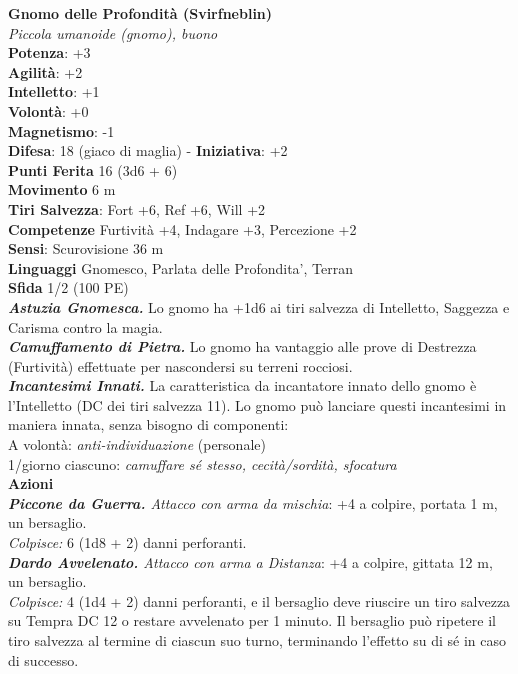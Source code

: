\begin{multicols}{2}
\medskip\textbf{Gnomo delle Profondità (Svirfneblin)} \\
\emph{Piccola umanoide (gnomo), buono}\\
\textbf{Potenza}: +3\\
\textbf{Agilità}: +2\\
\textbf{Intelletto}: +1\\
\textbf{Volontà}: +0\\
\textbf{Magnetismo}: -1\\
\textbf{Difesa}: 18 (giaco di maglia) - \textbf{Iniziativa}: +2\\
\textbf{Punti Ferita} 16 (3d6 + 6)\\
\textbf{Movimento} 6 m\\
\textbf{Tiri Salvezza}: Fort +6, Ref +6, Will +2\\
\textbf{Competenze} Furtività +4, Indagare +3, Percezione +2\\
\textbf{Sensi}: Scurovisione 36 m\\
\textbf{Linguaggi} Gnomesco, Parlata delle Profondita', Terran\\
\textbf{Sfida} 1/2 (100 PE)\smallskip\\
\emph{\textbf{Astuzia Gnomesca.}} Lo gnomo ha +1d6 ai tiri salvezza di Intelletto, Saggezza e Carisma contro la magia.\\
\emph{\textbf{Camuffamento di Pietra.}} Lo gnomo ha vantaggio alle prove di Destrezza (Furtività) effettuate per nascondersi su terreni rocciosi.\\
\emph{\textbf{Incantesimi Innati.}} La caratteristica da incantatore innato dello gnomo è l'Intelletto (DC dei tiri salvezza 11). Lo gnomo può lanciare questi incantesimi in maniera innata, senza bisogno di componenti:\\
A volontà: \emph{anti-individuazione} (personale)\\
1/giorno ciascuno: \emph{camuffare sé stesso, cecità/sordità, sfocatura}\\
\smallskip\textbf{Azioni}\\
\emph{\textbf{Piccone da Guerra.} Attacco con arma da mischia}: +4 a colpire, portata 1 m, un bersaglio.\\
\emph{Colpisce:} 6 (1d8 + 2) danni perforanti.\\
\emph{\textbf{Dardo Avvelenato.} Attacco con arma a Distanza}: +4 a colpire, gittata 12 m, un bersaglio.\\
\emph{Colpisce:} 4 (1d4 + 2) danni perforanti, e il bersaglio deve riuscire un tiro salvezza su Tempra DC 12 o restare avvelenato per 1 minuto. Il bersaglio può ripetere il tiro salvezza al termine di ciascun suo turno, terminando l'effetto su di sé in caso di successo.\\

\end{multicols}
